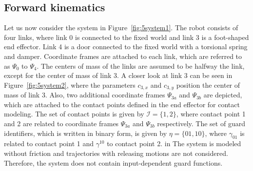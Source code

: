 \documentclass[../DC2017114Bouma.tex]{subfiles}
\begin{document}
\subsection{Forward kinematics}\label{sec:5kin}
Let us now consider the system in Figure~\ref{fig:5system1}. The robot consists of four links, where link 0 is connected to the fixed world and link 3 is a foot-shaped end effector. Link 4 is a door connected to the fixed world with a torsional spring and damper. Coordinate frames are attached to each link, which are referred to as $\Psi_0$ to $\Psi_4$. The centers of mass of the links are assumed to be halfway the link, except for the center of mass of link 3. A closer look at link 3 can be seen in Figure~\ref{fig:5system2}, where the parameters $c_{3,x}$ and $c_{3,y}$ position the center of mass of link 3. Also, two additional coordinate frames $\Psi_{3a}$ and $\Psi_{3b}$ are depicted, which are attached to the contact points defined in the end effector for contact modeling. The set of contact points is given by $\mathcal{I} = \{1,2\}$, where contact point 1 and 2 are related to coordinate frames $\Psi_{3a}$ and $\Psi_{3b}$ respectively. The set of guard identifiers, which is written in binary form, is given by $\eta = \{01,10\}$, where $\gamma_{01}$ is related to contact point 1 and $\gamma^{10}$ to contact point 2. in The system is modeled without friction and trajectories with releasing motions are not considered. Therefore, the system does not contain input-dependent guard functions.
\end{document}
